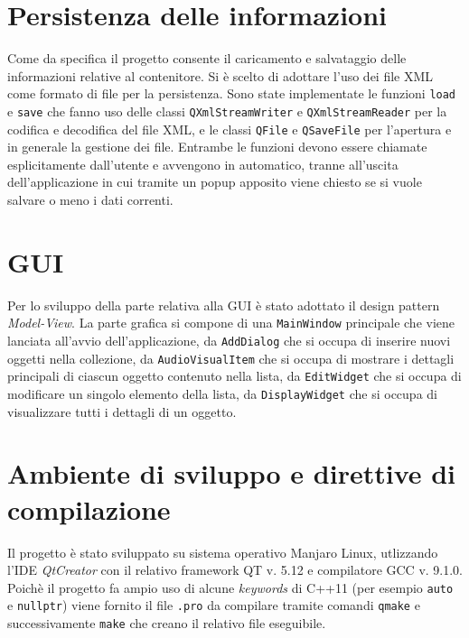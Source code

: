     \section*{Persistenza delle informazioni}
        Come da specifica il progetto consente il caricamento e salvataggio delle informazioni relative al contenitore. Si è scelto di adottare l'uso dei file \textsc{XML} come formato di file per la persistenza. \newline
        Sono state implementate le funzioni \texttt{load} e \texttt{save} che fanno uso delle classi \texttt{QXmlStreamWriter} e \texttt{QXmlStreamReader} per la codifica e decodifica del file \textsc{XML}, e le classi \texttt{QFile} e \texttt{QSaveFile} per l'apertura e in generale la gestione dei file. \newline
        Entrambe le funzioni devono essere chiamate esplicitamente dall'utente e avvengono in automatico, tranne all'uscita dell'applicazione in cui tramite un popup apposito viene chiesto se si vuole salvare o meno i dati correnti.

    \section*{GUI}
        Per lo sviluppo della parte relativa alla GUI è stato adottato il design pattern \textit{Model-View}. \newline
        La parte grafica si compone di una \texttt{MainWindow} principale che viene lanciata all'avvio dell'applicazione, da \texttt{AddDialog} che si occupa di inserire nuovi oggetti nella collezione, da \texttt{AudioVisualItem} che si occupa di mostrare i dettagli principali di ciascun oggetto contenuto nella lista, da \texttt{EditWidget} che si occupa di modificare un singolo elemento della lista, da \texttt{DisplayWidget} che si occupa di visualizzare tutti i dettagli di un oggetto. \newline


    \section*{Ambiente di sviluppo e direttive di compilazione}
        Il progetto è stato sviluppato su sistema operativo Manjaro Linux, utlizzando l'IDE \textit{QtCreator} con il relativo framework QT v. 5.12 e compilatore GCC v. 9.1.0. \newline
        Poichè il progetto fa ampio uso di alcune \textit{keywords} di C++11 (per esempio \texttt{auto} e \texttt{nullptr}) viene fornito il file \texttt{.pro} da compilare tramite comandi \texttt{qmake} e successivamente \texttt{make} che creano il relativo file eseguibile.

